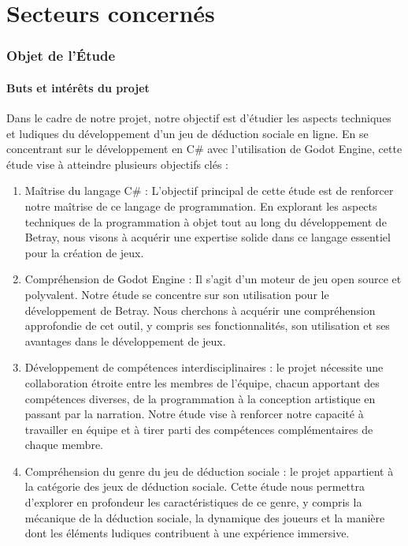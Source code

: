 \documentclass[
	article,			%
	11pt,				%
	oneside,			%
	a4paper,			%
	chapter=TITLE,
	french,			%
	sumario=tradicional
	]{base_nt}
\begin{document}
\part{Secteurs concernés}
\section{Objet de l'Étude}

\subsection{Buts et intérêts du projet}

Dans le cadre de notre projet, notre objectif est d'étudier les aspects techniques et ludiques du développement d'un jeu de déduction sociale en ligne. En se concentrant sur le développement en C\# avec l'utilisation de Godot Engine, cette étude vise à atteindre plusieurs objectifs clés :

\begin{enumerate}
    \item Maîtrise du langage C\# : L'objectif principal de cette étude est de renforcer notre maîtrise de ce langage de programmation. En explorant les aspects techniques de la programmation à objet tout au long du développement de Betray, nous visons à acquérir une expertise solide dans ce langage essentiel pour la création de jeux.

    \item Compréhension de Godot Engine : Il s'agit d'un moteur de jeu open source et polyvalent. Notre étude se concentre sur son utilisation pour le développement de Betray. Nous cherchons à acquérir une compréhension approfondie de cet outil, y compris ses fonctionnalités, son utilisation et ses avantages dans le développement de jeux.

    \item Développement de compétences interdisciplinaires : le projet nécessite une collaboration étroite entre les membres de l'équipe, chacun apportant des compétences diverses, de la programmation à la conception artistique en passant par la narration. Notre étude vise à renforcer notre capacité à travailler en équipe et à tirer parti des compétences complémentaires de chaque membre.

    \item Compréhension du genre du jeu de déduction sociale : le projet appartient à la catégorie des jeux de déduction sociale. Cette étude nous permettra d'explorer en profondeur les caractéristiques de ce genre, y compris la mécanique de la déduction sociale, la dynamique des joueurs et la manière dont les éléments ludiques contribuent à une expérience immersive.
\end{enumerate}
\end{document}

